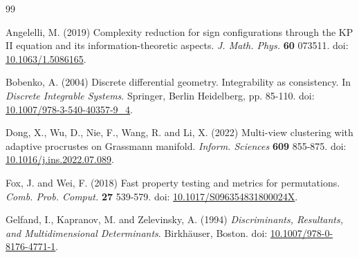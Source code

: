 \documentclass[10pt]{article}
\theoremstyle{remark}%
\theoremstyle{definition}%
\begin{document}




\begin{thebibliography}{99}
{\footnotesize 

Angelelli, M. (2019) Complexity reduction for sign configurations through the KP II equation and its information-theoretic aspects. {\em J. Math. Phys.} \textbf{60} 073511. doi: \href{https://doi.org/10.1063/1.5086165}{10.1063/1.5086165}.



Bobenko, A. (2004) Discrete differential geometry. Integrability as consistency. In {\em Discrete Integrable Systems}. Springer, Berlin Heidelberg, pp. 85-110. doi: \href{https://doi.org/10.1007/978-3-540-40357-9\_4}{10.1007/978-3-540-40357-9\_4}. 

Dong, X., Wu, D., Nie, F., Wang, R. and Li, X. (2022) Multi-view clustering with adaptive procrustes on Grassmann manifold. {\em Inform. Sciences} \textbf{609} 855-875. doi: \href{https://doi.org/10.1016/j.ins.2022.07.089}{10.1016/j.ins.2022.07.089}.

Fox, J. and Wei, F. (2018) Fast property testing and metrics for permutations. {\em Comb. Prob. Comput.} \textbf{27} 539-579. doi: \href{https://doi.org/10.1017/S096354831800024X}{10.1017/S096354831800024X}.

Gelfand, I., Kapranov, M. and Zelevinsky, A. (1994) {\em Discriminants, Resultants, and Multidimensional Determinants}. Birkh\"{a}user, Boston. doi: \href{https://doi.org/10.1007/978-0-8176-4771-1}{10.1007/978-0-8176-4771-1}.

}
\end{thebibliography}
\end{document}

